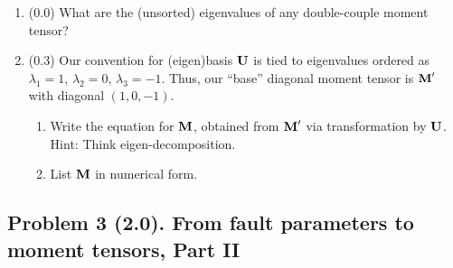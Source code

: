 \documentclass[11pt,titlepage,fleqn]{article}
\begin{document}
\begin{enumerate}

\item (0.0) What are the (unsorted) eigenvalues of any double-couple moment tensor?


\item (0.3) Our convention for (eigen)basis $\mbox{${\bf U}$}$ is tied to eigenvalues ordered as $\lambda_1 = 1$, $\lambda_2 = 0$, $\lambda_3 = -1$. Thus, our ``base'' diagonal moment tensor is $\mbox{${\bf M}$}'$ with diagonal $(1, 0, -1)$.
%
\begin{enumerate}
\item Write the equation for $\mbox{${\bf M}$}$, obtained from $\mbox{${\bf M}$}'$ via transformation by $\mbox{${\bf U}$}$.
Hint: Think eigen-decomposition.
\item List $\mbox{${\bf M}$}$ in numerical form.
\end{enumerate}

\end{enumerate}


\subsection*{Problem 3 (2.0). From fault parameters to moment tensors, Part II}
\end{document}
